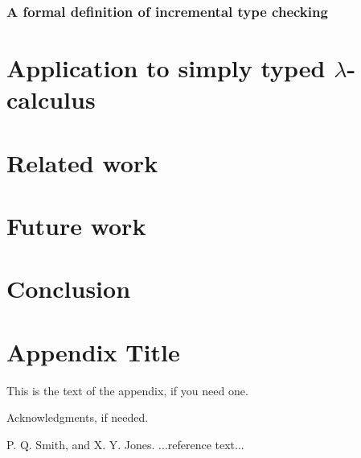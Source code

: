 \documentclass[preprint,9pt,authoryear]{sigplanconf}
\begin{document}
\subsubsection{A formal definition of incremental type checking}

\section{Application to simply typed $\lambda$-calculus}

\section{Related work}

\section{Future work}

\section{Conclusion}

\appendix
\section{Appendix Title}

This is the text of the appendix, if you need one.

\acks

Acknowledgments, if needed.





\begin{thebibliography}{}
\softraggedright

P. Q. Smith, and X. Y. Jones. ...reference text...

\end{thebibliography}
\end{document}
